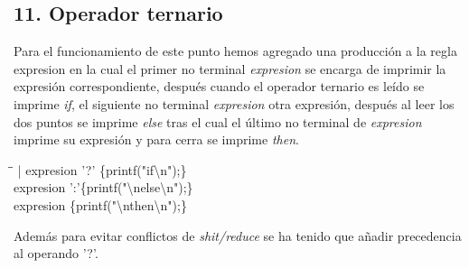 \documentclass[11pt,spanish]{article}
\begin{document}
		\subsection*{11. Operador ternario}
		\label{subsec:11}
		Para el funcionamiento de este punto hemos agregado una producción a la regla {\ttfamily expresion} en la cual el primer no terminal \textit {expresion} se encarga de imprimir la expresión correspondiente, después cuando el operador ternario es leído se imprime \textit {if}, el siguiente no terminal \textit {expresion} otra expresión, después al leer los dos puntos se imprime \textit {else} tras el cual el último no terminal de \textit {expresion} imprime su expresión y para cerra se imprime \textit {then}.
		\begin{tcolorbox}
		\begin{tabbing}
			\hspace*{1cm}\= \hspace*{4cm}\=\kill
			| expresion '?' \>\> \{printf("if\textbackslash n");\}\\
			\>expresion ':'\>\{printf("\textbackslash nelse\textbackslash n");\}\\
			\>expresion \>\{printf("\textbackslash nthen\textbackslash n");\}
			
		\end{tabbing}
		\end{tcolorbox}
		Además para evitar conflictos de \textit {shit/reduce} se ha tenido que añadir precedencia al operando '?'.
\end{document}
